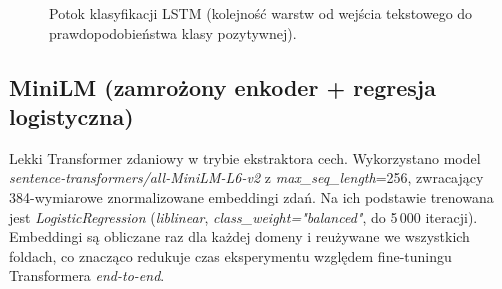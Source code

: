 \documentclass[runningheads]{llncs}
\begin{document}
\begin{figure}[h]
\centering
{}
\caption{Potok klasyfikacji LSTM (kolejność warstw od wejścia tekstowego do prawdopodobieństwa klasy pozytywnej).}
\end{figure}

\subsection*{MiniLM (zamrożony enkoder + regresja logistyczna)}
Lekki Transformer zdaniowy w trybie ekstraktora cech. Wykorzystano model \textit{sentence-transformers/all-MiniLM-L6-v2} \cite{wang2020minilm,reimers-2019-sentence-bert} z \textit{max\_seq\_length}=256, zwracający 384-wymiarowe znormalizowane embeddingi zdań. Na ich podstawie trenowana jest \textit{LogisticRegression} (\textit{liblinear}, \textit{class\_weight="balanced"}, do 5\,000 iteracji). Embeddingi są obliczane raz dla każdej domeny i reużywane we wszystkich foldach, co znacząco redukuje czas eksperymentu względem fine-tuningu Transformera \textit{end-to-end}.
\end{document}
